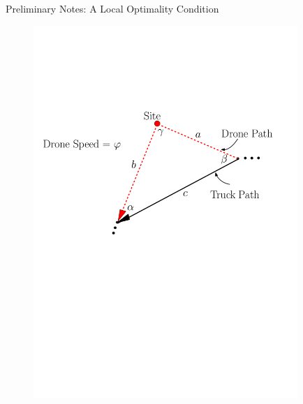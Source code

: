 \documentclass{beamer}
\begin{document}
\begin{frame}[t]{Preliminary Notes: A Local Optimality Condition}
 \begin{figure}
    \centering
    \includegraphics[width=10cm]{slide_imgs/locopt.pdf}
 \end{figure}

 \begin{center}
 \end{center}
 
\end{frame}
\end{document}
